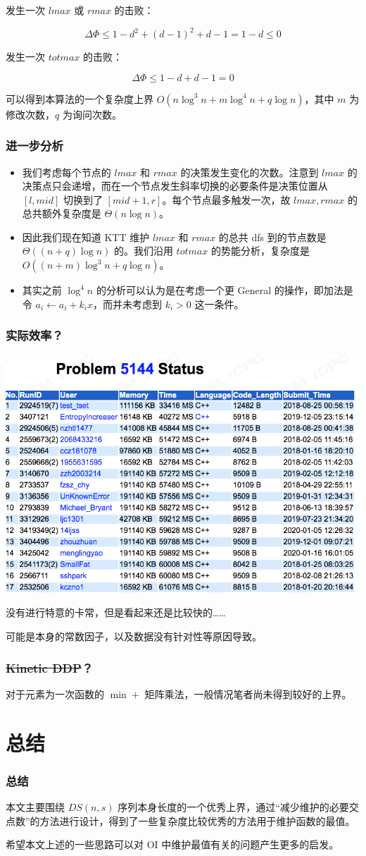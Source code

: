 \documentclass[mathserif]{ctexbeamer}
\begin{document}
\frame
{
  发生一次 $lmax$ 或 $rmax$ 的击败：
  
  $$ \Delta \Phi \le 1 -d^2 + (d-1)^2 + d-1 = 1-d \le 0 $$

  发生一次 $totmax$ 的击败：
  
  $$ \Delta \Phi \le 1 -d + d-1 = 0 $$
  
  可以得到本算法的一个复杂度上界 $O(n\log^3 n + m\log^4 n + q\log n)$，其中 $m$ 为修改次数，$q$ 为询问次数。
}

\frame
{
  \frametitle{进一步分析}
  
  \begin{itemize}
  
  
  \item<1->我们考虑每个节点的 $lmax$ 和 $rmax$ 的决策发生变化的次数。注意到 $lmax$ 的决策点只会递增，而在一个节点发生斜率切换的必要条件是决策位置从 $[l, mid]$ 切换到了 $[mid+1, r]$。每个节点最多触发一次，故 $lmax, rmax$ 的总共额外复杂度是 $\Theta(n\log n)$。

  \item<2->因此我们现在知道 KTT 维护 $lmax$ 和 $rmax$ 的总共 dfs 到的节点数是 $\Theta((n + q)\log n)$ 的。我们沿用 $totmax$ 的势能分析，复杂度是 $O((n+m)\log^3 n + q\log n)$。
  
  \item<3-> 其实之前 $\log^4 n$ 的分析可以认为是在考虑一个更 General 的操作，即加法是令 $a_i \leftarrow a_i + k_i x$，而并未考虑到 $k_i > 0$ 这一条件。
  \end{itemize}

}

\frame
{
  \frametitle{实际效率？}
  
  \includegraphics[width=0.4\linewidth]{image1.png}
  
  没有进行特意的卡常，但是看起来还是比较快的……
  
  可能是本身的常数因子，以及数据没有针对性等原因导致。
}

\frame
{
  \frametitle{\sout{Kinetic DDP}？}
  
  对于元素为一次函数的 $\min +$ 矩阵乘法，一般情况笔者尚未得到较好的上界。
}

\section{总结}
\frame
{
  \frametitle{总结}
  
  本文主要围绕 $DS(n,s)$ 序列本身长度的一个优秀上界，通过“减少维护的必要交点数”的方法进行设计，得到了一些复杂度比较优秀的方法用于维护函数的最值。
  
  希望本文上述的一些思路可以对 OI 中维护最值有关的问题产生更多的启发。
}
\end{document}
